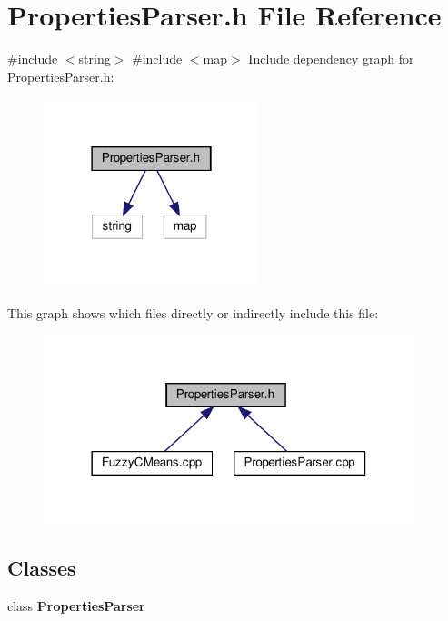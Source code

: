 \section{Properties\+Parser.\+h File Reference}
\label{_properties_parser_8h}
{\ttfamily \#include $<$string$>$}\newline
{\ttfamily \#include $<$map$>$}\newline
Include dependency graph for Properties\+Parser.\+h\+:
\nopagebreak
\begin{figure}[H]
\begin{center}
\leavevmode
\includegraphics[width=178pt]{_properties_parser_8h__incl}
\end{center}
\end{figure}
This graph shows which files directly or indirectly include this file\+:
\nopagebreak
\begin{figure}[H]
\begin{center}
\leavevmode
\includegraphics[width=306pt]{_properties_parser_8h__dep__incl}
\end{center}
\end{figure}
\subsection*{Classes}
\begin{DoxyCompactItemize}
\item 
class \textbf{ Properties\+Parser}
\end{DoxyCompactItemize}

